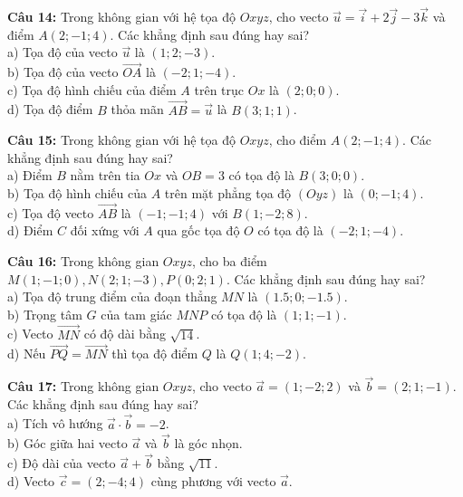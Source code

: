 \documentclass[12pt]{article}
\begin{document}
	\vspace{4mm}
	\noindent \textbf{Câu 14:} Trong không gian với hệ tọa độ $Oxyz$, cho vecto $\vec{u} = \vec{i} + 2\vec{j} - 3\vec{k}$ và điểm $A(2; -1; 4)$. Các khẳng định sau đúng hay sai? \\
	\noindent a) Tọa độ của vecto $\vec{u}$ là $(1; 2; -3)$. \\
	\noindent b) Tọa độ của vecto $\vec{OA}$ là $(-2; 1; -4)$. \\
	\noindent c) Tọa độ hình chiếu của điểm $A$ trên trục $Ox$ là $(2; 0; 0)$. \\
	\noindent d) Tọa độ điểm $B$ thỏa mãn $\vec{AB} = \vec{u}$ là $B(3; 1; 1)$.
	
	\vspace{4mm}
	\noindent \textbf{Câu 15:} Trong không gian với hệ tọa độ $Oxyz$, cho điểm $A(2; -1; 4)$. Các khẳng định sau đúng hay sai? \\
	\noindent a) Điểm $B$ nằm trên tia $Ox$ và $OB = 3$ có tọa độ là $B(3; 0; 0)$. \\
	\noindent b) Tọa độ hình chiếu của $A$ trên mặt phẳng tọa độ $(Oyz)$ là $(0; -1; 4)$. \\
	\noindent c) Tọa độ vecto $\vec{AB}$ là $(-1; -1; 4)$ với $B(1; -2; 8)$. \\
	\noindent d) Điểm $C$ đối xứng với $A$ qua gốc tọa độ $O$ có tọa độ là $(-2; 1; -4)$.
	
	\vspace{4mm}
	\noindent \textbf{Câu 16:} Trong không gian $Oxyz$, cho ba điểm $M(1; -1; 0), N(2; 1; -3), P(0; 2; 1)$. Các khẳng định sau đúng hay sai? \\
	\noindent a) Tọa độ trung điểm của đoạn thẳng $MN$ là $(1.5; 0; -1.5)$. \\
	\noindent b) Trọng tâm $G$ của tam giác $MNP$ có tọa độ là $(1; 1; -1)$. \\
	\noindent c) Vecto $\vec{MN}$ có độ dài bằng $\sqrt{14}$. \\
	\noindent d) Nếu $\vec{PQ} = \vec{MN}$ thì tọa độ điểm $Q$ là $Q(1; 4; -2)$.
	
	\vspace{4mm}
	\noindent \textbf{Câu 17:} Trong không gian $Oxyz$, cho vecto $\vec{a} = (1; -2; 2)$ và $\vec{b} = (2; 1; -1)$. Các khẳng định sau đúng hay sai? \\
	\noindent a) Tích vô hướng $\vec{a} \cdot \vec{b} = -2$. \\
	\noindent b) Góc giữa hai vecto $\vec{a}$ và $\vec{b}$ là góc nhọn. \\
	\noindent c) Độ dài của vecto $\vec{a} + \vec{b}$ bằng $\sqrt{11}$. \\
	\noindent d) Vecto $\vec{c} = (2; -4; 4)$ cùng phương với vecto $\vec{a}$.
	
\end{document}
